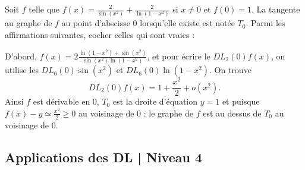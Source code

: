 \begin{question}
Soit $f$ telle que $\displaystyle f(x)=\frac{2}{\sin (x^2)}+\frac{2}{\ln (1-x^2)}$ si $x\neq 0$ et $f(0)=1$. La tangente au graphe de $f$ au point d'abscisse $0$ lorsqu'elle existe est notée $T_0$. Parmi les affirmations suivantes, cocher celles qui sont vraies :
\begin{answers}  
\end{answers}
\vskip2mm
\begin{explanations}
D'abord, $\displaystyle f(x)=2\frac{\ln (1-x^2)+\sin (x^2)}{\sin (x^2)\ln (1-x^2)}$, et pour écrire le $DL_2(0)f(x)$, on utilise les $DL_6(0)\sin (x^2)$ et $DL_6(0)\ln(1-x^2)$. On trouve
$$\displaystyle DL_2(0)f(x)=1+\frac{x^2}{2}+o(x^2).$$
Ainsi $f$ est dérivable en $0$, $T_0$ est la droite d'équation $\displaystyle y=1$ et puisque $\displaystyle f(x)-y\simeq \frac{x^2}{2}\geq 0$ au voisinage de $0$ : le graphe de $f$ est au dessus de $T_0$ au voisinage de $0$.
\end{explanations}
\end{question}

\subsection{Applications des DL | Niveau 4}

